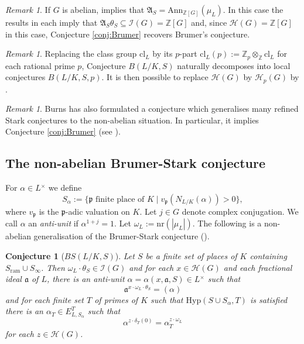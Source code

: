 \documentclass[12pt]{amsart}
\theoremstyle{plain}
\newtheorem{conj}[theorem]{Conjecture}
\theoremstyle{remark}
\newtheorem{remark}[theorem]{Remark}
\theoremstyle{definition}
\numberwithin{equation}{section}
\begin{document}
{\begin{remark}
If $G$ is abelian, \cite[Lemma 1.1, p.~82]{MR782485} implies that $\mathfrak{A}_{S} = {\mathrm{Ann}}_{{\mathbb{Z}}[G]}(\mu_{L})$.
In this case the results in \cite{MR525346, MR524276, MR579702} each imply that
$\mathfrak{A}_{S} \theta_{S} \subseteq \mathcal{I}(G) = {\mathbb{Z}}[G]$ and,
since $\mathcal{H}(G) = {\mathbb{Z}}[G]$ in this case, Conjecture \ref{conj:Brumer} recovers Brumer's conjecture.
\end{remark}

\begin{remark}\label{rmk:p-part-of-Brumer}
Replacing the class group ${\mathrm{cl}}_{L}$ by its $p$-part ${\mathrm{cl}}_{L}(p):={\mathbb{Z}}_{p} \otimes_{\mathbb{Z}} {\mathrm{cl}}_{L}$ for each rational prime $p$,
Conjecture $B(L/K,S)$ naturally decomposes into local conjectures $B(L/K,S,p)$.
It is then possible to replace $\mathcal{H}(G)$ by $\mathcal{H}_{p}(G)$ by \cite[Lemma 1.4]{MR2976321}.
\end{remark}

\begin{remark}
Burns \cite{MR2845620} has also formulated a conjecture which generalises many refined Stark conjectures to the
non-abelian situation. In particular, it implies Conjecture \ref{conj:Brumer} (see \cite[Proposition 3.5.1]{MR2845620}).
\end{remark}

\subsection{The non-abelian Brumer-Stark conjecture}
For $\alpha \in L{^{\times}}$ we define
\[
S_{\alpha} :=  \{ \mathfrak{p} \mbox{ finite place of } K \mid v_{\mathfrak{p}}(N_{L/K}(\alpha))>0 \}, 
\]
where $v_{\mathfrak{p}}$ is the $\mathfrak{p}$-adic valuation on $K$.
Let $j \in G$ denote complex conjugation. We call $\alpha$ an {\it anti-unit} if $\alpha^{1+j} = 1$.
Let $\omega_L := {\mathrm{nr}} (|\mu_L|)$. The following is a non-abelian generalisation of the Brumer-Stark conjecture (\cite[Conjecture 2.7]{MR2976321}).

\begin{conj}[$BS(L/K,S)$] \label{conj:Brumer-Stark}
Let $S$ be a finite set of places of $K$ containing $S_{\mathrm{ram}} \cup S_{\infty}$.
Then $\omega_L \cdot \theta_S \in \mathcal I(G)$ and for each $x \in \mathcal H(G)$ and each fractional ideal $\mathfrak{a}$ of $L$,
there is an anti-unit $\alpha = \alpha(x,\mathfrak{a},S) \in L{^{\times}}$ such that
\[
\mathfrak{a}^{x \cdot \omega_L \cdot \theta_S} = (\alpha)
\]
and for each finite set $T$ of primes of $K$ such that ${\mathrm{Hyp}}(S \cup S_{\alpha},T)$ is satisfied there is an $\alpha_{T} \in E_{L,S_{\alpha}}^{T}$
such that
\begin{equation} \label{eqn:abelian-ersatz}
\alpha^{z \cdot \delta_T(0)} = \alpha_T^{z \cdot \omega_L}
\end{equation}
for each $z \in \mathcal H(G)$.
\end{conj}

}
\end{document}
